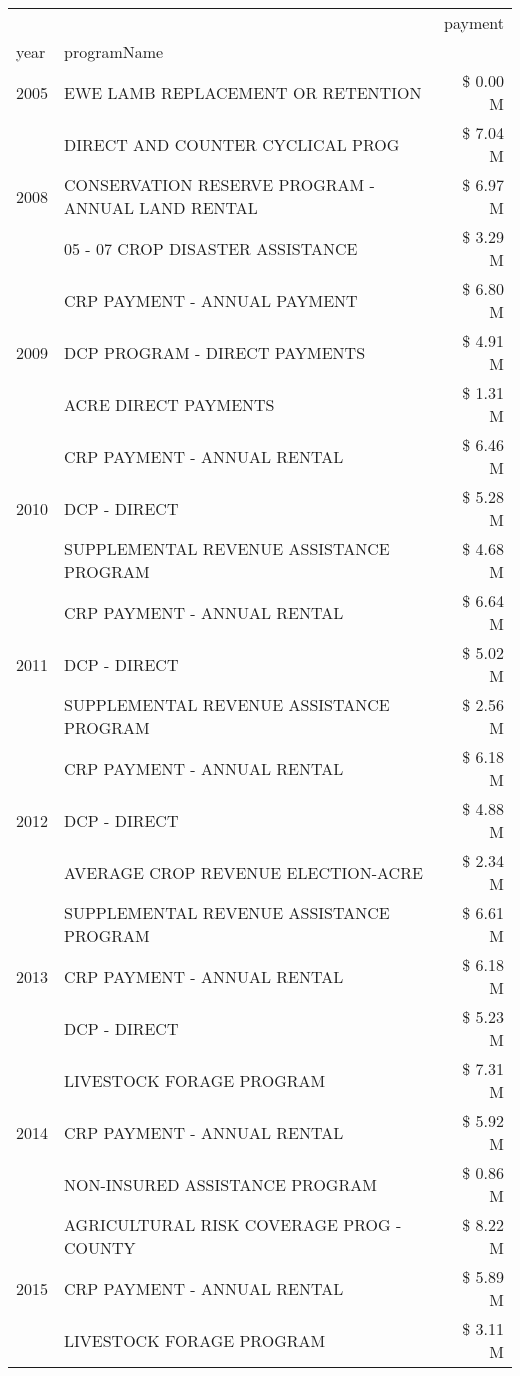 \begin{tabular}{llr}
\toprule
 &  & payment \\
year & programName &  \\
\midrule
2005 & EWE LAMB REPLACEMENT OR RETENTION & \$ 0.00 M \\
\cline{1-3}
\multirow[t]{3}{*}{2008} & DIRECT AND COUNTER CYCLICAL PROG & \$ 7.04 M \\
 & CONSERVATION RESERVE PROGRAM - ANNUAL LAND RENTAL & \$ 6.97 M \\
 & 05 - 07 CROP DISASTER ASSISTANCE & \$ 3.29 M \\
\cline{1-3}
\multirow[t]{3}{*}{2009} & CRP PAYMENT - ANNUAL PAYMENT & \$ 6.80 M \\
 & DCP PROGRAM - DIRECT PAYMENTS & \$ 4.91 M \\
 & ACRE DIRECT PAYMENTS & \$ 1.31 M \\
\cline{1-3}
\multirow[t]{3}{*}{2010} & CRP PAYMENT - ANNUAL RENTAL & \$ 6.46 M \\
 & DCP - DIRECT & \$ 5.28 M \\
 & SUPPLEMENTAL REVENUE ASSISTANCE PROGRAM & \$ 4.68 M \\
\cline{1-3}
\multirow[t]{3}{*}{2011} & CRP PAYMENT - ANNUAL RENTAL & \$ 6.64 M \\
 & DCP - DIRECT & \$ 5.02 M \\
 & SUPPLEMENTAL REVENUE ASSISTANCE PROGRAM & \$ 2.56 M \\
\cline{1-3}
\multirow[t]{3}{*}{2012} & CRP PAYMENT - ANNUAL RENTAL & \$ 6.18 M \\
 & DCP - DIRECT & \$ 4.88 M \\
 & AVERAGE CROP REVENUE ELECTION-ACRE & \$ 2.34 M \\
\cline{1-3}
\multirow[t]{3}{*}{2013} & SUPPLEMENTAL REVENUE ASSISTANCE PROGRAM & \$ 6.61 M \\
 & CRP PAYMENT - ANNUAL RENTAL & \$ 6.18 M \\
 & DCP - DIRECT & \$ 5.23 M \\
\cline{1-3}
\multirow[t]{3}{*}{2014} & LIVESTOCK FORAGE PROGRAM & \$ 7.31 M \\
 & CRP PAYMENT - ANNUAL RENTAL & \$ 5.92 M \\
 & NON-INSURED ASSISTANCE PROGRAM & \$ 0.86 M \\
\cline{1-3}
\multirow[t]{3}{*}{2015} & AGRICULTURAL RISK COVERAGE PROG - COUNTY & \$ 8.22 M \\
 & CRP PAYMENT - ANNUAL RENTAL & \$ 5.89 M \\
 & LIVESTOCK FORAGE PROGRAM & \$ 3.11 M \\

\end{tabular}
